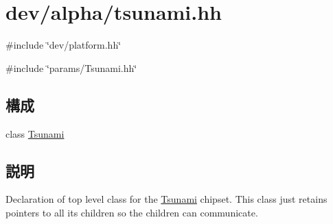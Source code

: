 \hypertarget{tsunami_8hh}{
\section{dev/alpha/tsunami.hh}
\label{tsunami_8hh}
}
{\ttfamily \#include \char`\"{}dev/platform.hh\char`\"{}}\par
{\ttfamily \#include \char`\"{}params/Tsunami.hh\char`\"{}}\par
\subsection*{構成}
\begin{DoxyCompactItemize}
\item 
class \hyperlink{classTsunami}{Tsunami}
\end{DoxyCompactItemize}


\subsection{説明}
Declaration of top level class for the \hyperlink{classTsunami}{Tsunami} chipset. This class just retains pointers to all its children so the children can communicate. 